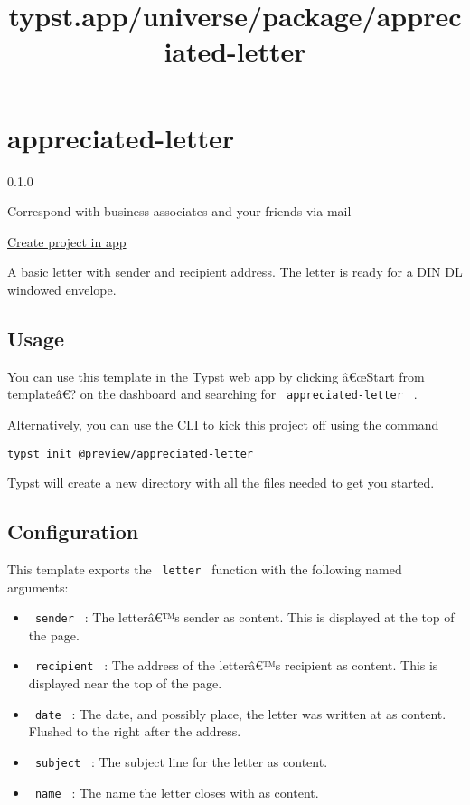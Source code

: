 \title{typst.app/universe/package/appreciated-letter}

\label{banner}
\label{template-thumbnail}

\section{appreciated-letter}\label{appreciated-letter}

{ 0.1.0 }

Correspond with business associates and your friends via mail

\href{/app?template=appreciated-letter&version=0.1.0}{Create project in
app}

\label{readme}
A basic letter with sender and recipient address. The letter is ready
for a DIN DL windowed envelope.

\subsection{Usage}\label{usage}

You can use this template in the Typst web app by clicking â€œStart from
templateâ€? on the dashboard and searching for
\texttt{\ appreciated-letter\ } .

Alternatively, you can use the CLI to kick this project off using the
command

\begin{verbatim}
typst init @preview/appreciated-letter
\end{verbatim}

Typst will create a new directory with all the files needed to get you
started.

\subsection{Configuration}\label{configuration}

This template exports the \texttt{\ letter\ } function with the
following named arguments:

\begin{itemize}
\tightlist
\item
  \texttt{\ sender\ } : The letterâ€™s sender as content. This is
  displayed at the top of the page.
\item
  \texttt{\ recipient\ } : The address of the letterâ€™s recipient as
  content. This is displayed near the top of the page.
\item
  \texttt{\ date\ } : The date, and possibly place, the letter was
  written at as content. Flushed to the right after the address.
\item
  \texttt{\ subject\ } : The subject line for the letter as content.
\item
  \texttt{\ name\ } : The name the letter closes with as content.
\end{itemize}

